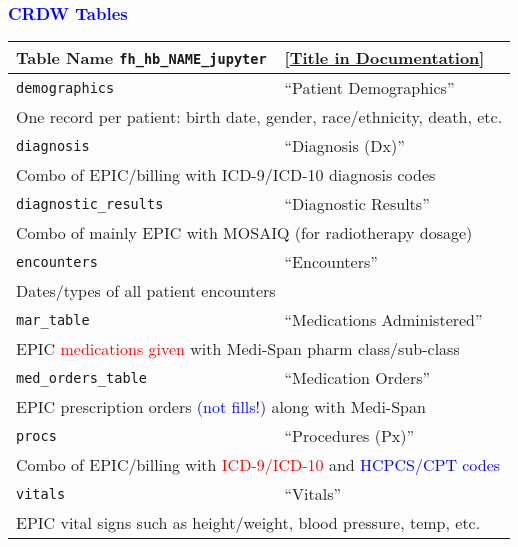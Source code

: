 \documentclass[11pt,pdftex,dvipsnames,usenames]{beamer}
\begin{document}
\begin{frame}[fragile]\frametitle{\bf\textcolor{blue}{CRDW Tables}}
\begin{tabular}{lll}
Table Name \texttt{fh\_hb\_NAME\_jupyter} & 
\textcolor{PineGreen}{[\href{https://share.ctsi.mcw.edu/s/8gj39XFxP9oeGGY}{Title in Documentation}]} \\ \hline
\texttt{demographics}       & ``Patient Demographics'' \\ 
\multicolumn{3}{l}{One record per patient: birth date, gender, 
race/ethnicity, death, etc.} \\ \hline 
\texttt{diagnosis}          & ``Diagnosis (Dx)'' \\
\multicolumn{3}{l}{Combo of EPIC/billing with ICD-9/ICD-10 
diagnosis codes} \\  \hline  
\texttt{diagnostic\_results}& ``Diagnostic Results'' \\
\multicolumn{3}{l}{Combo of mainly EPIC with MOSAIQ (for radiotherapy dosage)} \\  \hline  
\texttt{encounters}       & ``Encounters'' \\ 
\multicolumn{3}{l}{Dates/types of all patient encounters} \\ \hline 
\texttt{mar\_table}         & ``Medications Administered''\\
\multicolumn{3}{l}{EPIC \textcolor{red}{medications given} with Medi-Span pharm class/sub-class} \\   \hline 
\texttt{med\_orders\_table} & ``Medication Orders'' \\
\multicolumn{3}{l}{EPIC prescription orders \textcolor{blue}{(not fills!)} along with Medi-Span} \\  \hline  
\texttt{procs}              & ``Procedures (Px)'' \\
\multicolumn{3}{l}{Combo of EPIC/billing with 
\textcolor{red}{ICD-9/ICD-10} 
and \textcolor{blue}{HCPCS/CPT codes}} \\  \hline  
\texttt{vitals}             & ``Vitals'' \\
\multicolumn{3}{l}{EPIC vital signs such as height/weight, blood pressure,
temp, etc. } \\   \hline 
\end{tabular}
\end{frame}
\end{document}
